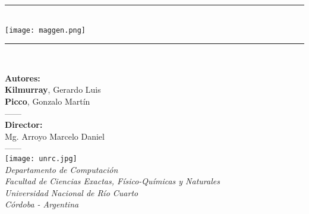 \newcommand{\HRule}{\rule{\linewidth}{0.6mm}}
\begin{titlepage}

\begin{center}


\vspace*{2cm}

  {\Large{\textbf{}}}
\vspace*{0.3cm}
\HRule \\
  \vspace*{0.6cm}
{\centering \texttt{[image: maggen.png]}}
 
\HRule \\[0.5cm]

\vspace*{1.5cm}

\large{\textbf{Autores:}\\ \textbf{Kilmurray}, Gerardo Luis\\ \textbf{Picco}, Gonzalo Martín\\}
\vspace*{0.6cm}
{------\\}
\vspace*{0.6cm}
\large{\textbf{Director:}\\ Mg. Arroyo Marcelo Daniel\\}
\vspace*{1cm}
{------\\}
\vspace*{2cm}
 \texttt{[image: unrc.jpg]}\\
\vspace*{0.5cm}
\normalsize{\textit{Departamento de Computación\\
                    Facultad de Ciencias Exactas, Físico-Químicas y Naturales\\
                    Universidad Nacional de Río Cuarto\\
                    Córdoba - Argentina}}
\end{center}
\end{titlepage}
\sloppy

\titlepage
